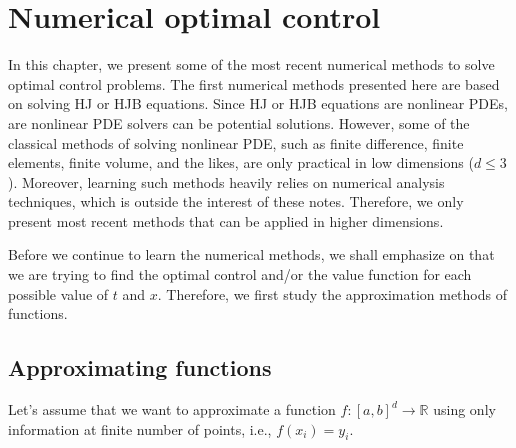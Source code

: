 \documentclass[11pt]{book}
\begin{document}
\chapter{Numerical optimal control}
In this chapter, we present some of the most recent numerical methods to solve optimal control problems. The first numerical methods presented here are based on solving HJ or HJB equations. Since HJ or HJB equations are nonlinear PDEs, are nonlinear PDE solvers can be potential solutions. However, some of the classical methods  of solving nonlinear PDE, such as finite difference, finite elements, finite volume, and the likes, are only practical in low dimensions ($d\le3$). Moreover, learning such methods heavily relies on numerical analysis techniques, which is outside the interest of these notes. Therefore, we only present most recent methods that can be applied in higher dimensions.

Before we continue to learn the numerical methods, we shall emphasize on that we are trying to find the optimal control and/or the value function for each possible value of $t$ and $x$. Therefore, we first study the approximation methods of functions. 

\section{Approximating functions}
Let's assume that we want to approximate a function $f:[a,b]^d\to\mathbb{R}$ using only information at finite number of points, i.e., $f(x_i)=y_i$.
\end{document}
